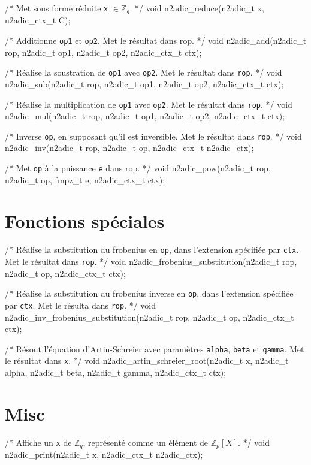 \documentclass[11pt]{article}
\begin{document}
/* Met sous forme réduite \texttt{x} $\in \mathbb{Z}_q$. */
void n2adic_reduce(n2adic_t x, n2adic_ctx_t C);

/* Additionne \texttt{op1} et \texttt{op2}. Met le résultat dans rop. */
void n2adic_add(n2adic_t rop, n2adic_t op1, n2adic_t op2, n2adic_ctx_t ctx);

/* Réalise la soustration de \texttt{op1} avec \texttt{op2}. Met le résultat dans \texttt{rop}. */
void n2adic_sub(n2adic_t rop, n2adic_t op1, n2adic_t op2, n2adic_ctx_t ctx);

/* Réalise la multiplication de \texttt{op1} avec \texttt{op2}. Met le résultat dans \texttt{rop}. */
void n2adic_mul(n2adic_t rop, n2adic_t op1, n2adic_t op2, n2adic_ctx_t ctx);

/* Inverse \texttt{op}, en supposant qu'il est inversible. Met le résultat dans \texttt{rop}. */
void n2adic_inv(n2adic_t rop, n2adic_t op, n2adic_ctx_t n2adic_ctx);

/* Met \texttt{op} à la puissance \texttt{e} dans rop. */
void n2adic_pow(n2adic_t rop, n2adic_t op, fmpz_t e, n2adic_ctx_t ctx);


\section{Fonctions spéciales}

/* Réalise la substitution du frobenius en \texttt{op}, dans l'extension spécifiée par \texttt{ctx}. Met le résultat dans \texttt{rop}. */
void n2adic_frobenius_substitution(n2adic_t rop, n2adic_t op, n2adic_ctx_t ctx);

/* Réalise la substitution du frobenius inverse en \texttt{op}, dans l'extension spécifiée par \texttt{ctx}. Met le résulta dans \texttt{rop}. */
void n2adic_inv_frobenius_substitution(n2adic_t rop, n2adic_t op, n2adic_ctx_t ctx);

/* Résout l'équation d'Artin-Schreier avec paramètres \texttt{alpha}, \texttt{beta} et \texttt{gamma}. Met le résultat dans \texttt{x}. */
void n2adic_artin_schreier_root(n2adic_t x, n2adic_t alpha, n2adic_t beta, n2adic_t gamma, n2adic_ctx_t ctx);


\section{Misc}
/* Affiche un \texttt{x} de $\mathbb{Z}_q$, représenté comme un élément de $\mathbb{Z}_p[X]$. */
void n2adic_print(n2adic_t x, n2adic_ctx_t n2adic_ctx);


%  
% 
\end{document}
